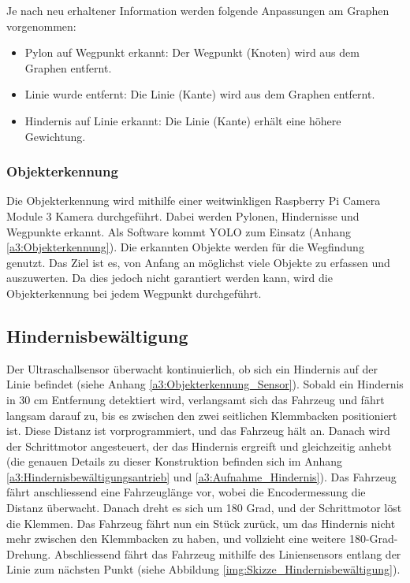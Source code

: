 \documentclass[../main.tex]{subfiles}
\begin{document}
Je nach neu erhaltener Information werden folgende Anpassungen am Graphen vorgenommen: \begin{itemize} 
  \item Pylon auf Wegpunkt erkannt: Der Wegpunkt (Knoten) wird aus dem Graphen entfernt.
  \item Linie wurde entfernt: Die Linie (Kante) wird aus dem Graphen entfernt. 
  \item Hindernis auf Linie erkannt: Die Linie (Kante) erhält eine höhere Gewichtung.
\end{itemize}

\subsubsection{Objekterkennung} \label{sub:Objekterkennung}
Die Objekterkennung wird mithilfe einer weitwinkligen Raspberry Pi Camera Module 3 Kamera durchgeführt. Dabei werden Pylonen, Hindernisse und Wegpunkte erkannt. Als Software kommt YOLO zum Einsatz (Anhang \ref{a3:Objekterkennung}). Die erkannten Objekte werden für die Wegfindung genutzt. Das Ziel ist es, von Anfang an möglichst viele Objekte zu erfassen und auszuwerten. Da dies jedoch nicht garantiert werden kann, wird die Objekterkennung bei jedem Wegpunkt durchgeführt. 

\subsection{Hindernisbewältigung}
Der Ultraschallsensor überwacht kontinuierlich, ob sich ein Hindernis auf der Linie befindet (siehe Anhang \ref{a3:Objekterkennung_Sensor}). Sobald ein Hindernis in 30 cm Entfernung detektiert wird, verlangsamt sich das Fahrzeug und fährt langsam darauf zu, bis es zwischen den zwei seitlichen Klemmbacken positioniert ist. Diese Distanz ist vorprogrammiert, und das Fahrzeug hält an. Danach wird der Schrittmotor angesteuert, der das Hindernis ergreift und gleichzeitig anhebt (die genauen Details zu dieser Konstruktion befinden sich im Anhang \ref{a3:Hindernisbewältigungsantrieb} und \ref{a3:Aufnahme_Hindernis}).
Das Fahrzeug fährt anschliessend eine Fahrzeuglänge vor, wobei die Encodermessung die Distanz überwacht. Danach dreht es sich um 180 Grad, und der Schrittmotor löst die Klemmen. Das Fahrzeug fährt nun ein Stück zurück, um das Hindernis nicht mehr zwischen den Klemmbacken zu haben, und vollzieht eine weitere 180-Grad-Drehung. Abschliessend fährt das Fahrzeug mithilfe des Liniensensors entlang der Linie zum nächsten Punkt (siehe Abbildung \ref{img:Skizze_Hindernisbewältigung}).
\end{document}
